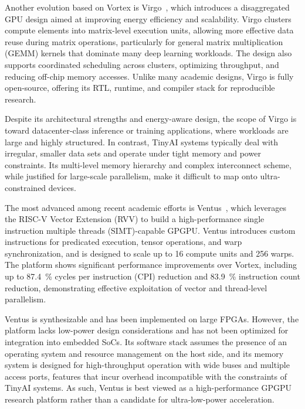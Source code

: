                 Another evolution based on Vortex is Virgo~\cite{virgo}, which introduces a disaggregated GPU design aimed at improving energy efficiency and scalability. Virgo clusters compute elements into matrix-level execution units, allowing more effective data reuse during matrix operations, particularly for general matrix multiplication (GEMM) kernels that dominate many deep learning workloads. The design also supports coordinated scheduling across clusters, optimizing throughput, and reducing off-chip memory accesses. Unlike many academic designs, Virgo is fully open-source, offering its RTL, runtime, and compiler stack for reproducible research.
                
                Despite its architectural strengths and energy-aware design, the scope of Virgo is toward datacenter-class inference or training applications, where workloads are large and highly structured. In contrast, TinyAI systems typically deal with irregular, smaller data sets and operate under tight memory and power constraints. Its multi-level memory hierarchy and complex interconnect scheme, while justified for large-scale parallelism, make it difficult to map onto ultra-constrained devices.
                
                The most advanced among recent academic efforts is Ventus~\cite{ventus}, which leverages the RISC-V Vector Extension (RVV) to build a high-performance single instruction multiple threads (SIMT)-capable GPGPU. Ventus introduces custom instructions for predicated execution, tensor operations, and warp synchronization, and is designed to scale up to 16 compute units and 256 warps. The platform shows significant performance improvements over Vortex, including up to \SI{87.4}{\percent} cycles per instruction (CPI) reduction and \SI{83.9}{\percent} instruction count reduction, demonstrating effective exploitation of vector and thread-level parallelism.
                
                Ventus is synthesizable and has been implemented on large FPGAs. However, the platform lacks low-power design considerations and has not been optimized for integration into embedded SoCs. Its software stack assumes the presence of an operating system and resource management on the host side, and its memory system is designed for high-throughput operation with wide buses and multiple access ports, features that incur overhead incompatible with the constraints of TinyAI systems. As such, Ventus is best viewed as a high-performance GPGPU research platform rather than a candidate for ultra-low-power acceleration.
                
